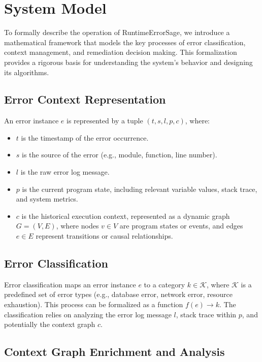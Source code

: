 \section{System Model}\label{sec:system-model}

To formally describe the operation of RuntimeErrorSage, we introduce a mathematical framework that models the key processes of error classification, context management, and remediation decision making. This formalization provides a rigorous basis for understanding the system's behavior and designing its algorithms.

\subsection{Error Context Representation}

An error instance $e$ is represented by a tuple $(t, s, l, p, c)$, where:
\begin{itemize}[leftmargin=*,align=left]
    \item $t$ is the timestamp of the error occurrence.
    \item $s$ is the source of the error (e.g., module, function, line number).
    \item $l$ is the raw error log message.
    \item $p$ is the current program state, including relevant variable values, stack trace, and system metrics.
    \item $c$ is the historical execution context, represented as a dynamic graph $G=(V, E)$, where nodes $v \in V$ are program states or events, and edges $e \in E$ represent transitions or causal relationships.\cite{graph_based_context_modeling_2021, log_analysis_survey_2016}
\end{itemize}

\subsection{Error Classification}

Error classification maps an error instance $e$ to a category $k \in \mathcal{K}$, where $\mathcal{K}$ is a predefined set of error types (e.g., database error, network error, resource exhaustion). This process can be formalized as a function $f(e) \to k$. The classification relies on analyzing the error log message $l$, stack trace within $p$, and potentially the context graph $c$.\cite{error_pattern_mining_ml_2019, graph_similarity_metrics_2019}

\subsection{Context Graph Enrichment and Analysis}

